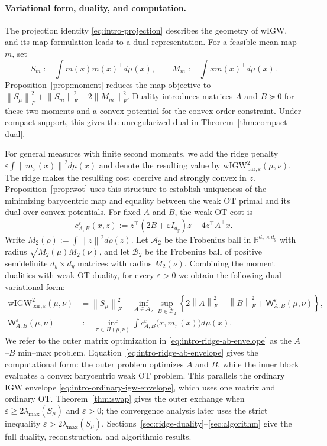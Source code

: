\documentclass[11pt]{article}
\newcommand{\R}{\mathbb R}
\newcommand{\norm}[1]{\left\lVert #1\right\rVert}
\newcommand{\wIGWeps}{\mathrm{wIGW}_{\mathrm{bar},\varepsilon}}
\theoremstyle{plain}
\theoremstyle{definition}
\theoremstyle{remark}
\begin{document}
\paragraph{Variational form, duality, and computation.}
The projection identity \eqref{eq:intro-projection} describes the geometry of wIGW,
and its map formulation leads to a dual representation. For a feasible mean map
$m$, set
\[
 S_m:=\int m(x)m(x)^\top d\mu(x),
 \qquad M_m:=\int x m(x)^\top d\mu(x).
\]
Proposition~\ref{prop:moment} reduces the map objective to
$\norm{S_\mu}_F^2+\norm{S_m}_F^2-2\norm{M_m}_F^2$. Duality introduces matrices
$A$ and $B\succeq0$ for these two moments and a convex potential for the convex
order constraint. Under compact support, this gives the unregularized dual in
Theorem~\ref{thm:compact-dual}.

For general measures with finite second moments, we add the ridge penalty
$\varepsilon\int\norm{m_\pi(x)}^2d\mu(x)$ and denote the resulting value by
$\wIGWeps^2(\mu,\nu)$. The ridge makes the resulting cost coercive and
strongly convex in $z$. Proposition~\ref{prop:wot} uses this structure to establish
uniqueness of the minimizing barycentric map and equality between the weak OT
primal and its dual over convex potentials. For fixed $A$ and $B$, the weak OT cost is
\[
 c_{A,B}^{\varepsilon}(x,z)
 :=z^\top(2B+\varepsilon I_{d_y})z-4z^\top A^\top x.
\]
Write $M_2(\rho):=\int\norm z^2d\rho(z)$. Let $\mathcal A_2$ be the Frobenius
ball in $\R^{d_x\times d_y}$ with radius $\sqrt{M_2(\mu)M_2(\nu)}$, and let
$\mathcal B_2$ be the Frobenius ball of positive semidefinite $d_y\times d_y$
matrices with radius $M_2(\nu)$. Combining the moment dualities with weak OT duality, for every
$\varepsilon>0$ we obtain the following dual variational form:
\begin{equation}\label{eq:intro-ridge-ab-envelope}
\begin{aligned}
 \wIGWeps^2(\mu,\nu)
 &=\norm{S_\mu}_F^2+
   \inf_{A\in\mathcal A_2}\sup_{B\in\mathcal B_2}
   \left\{2\norm A_F^2-\norm B_F^2+
   \mathsf W_{A,B}^{\varepsilon}(\mu,\nu)\right\},\\
 \mathsf W_{A,B}^{\varepsilon}(\mu,\nu)
 &:=\inf_{\pi\in\Pi(\mu,\nu)}
   \int c_{A,B}^{\varepsilon}\bigl(x,m_\pi(x)\bigr)d\mu(x).
\end{aligned}
\end{equation}
We refer to the outer matrix optimization in
\eqref{eq:intro-ridge-ab-envelope} as the \(A\)--\(B\) min--max problem.
Equation~\eqref{eq:intro-ridge-ab-envelope} gives the computational form: the
outer problem optimizes $A$ and $B$, while the inner block evaluates a convex
barycentric weak OT problem. This parallels the ordinary IGW envelope
\eqref{eq:intro-ordinary-igw-envelope}, which uses one matrix and ordinary OT.
Theorem~\ref{thm:swap} gives the outer exchange when
$\varepsilon\ge2\lambda_{\max}(S_\mu)$ and $\varepsilon>0$; the convergence
analysis later uses the strict inequality
$\varepsilon>2\lambda_{\max}(S_\mu)$.
Sections~\ref{sec:ridge-duality}--\ref{sec:algorithm} give the full duality,
reconstruction, and algorithmic results.
\end{document}
